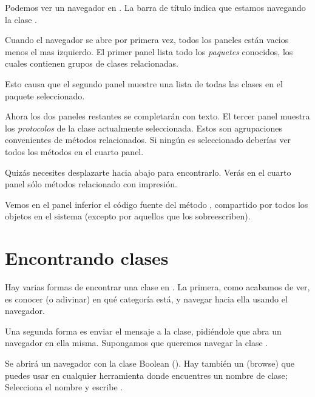 \documentclass[a4paper,10pt,twoside]{book}
\begin{document}
Podemos ver un navegador en .
La barra de t\'itulo indica que estamos navegando la clase .

Cuando el navegador se abre por primera vez, todos los paneles est\'an vacios menos el mas izquierdo.
El primer panel lista todo los \emph{paquetes} conocidos, los cuales contienen grupos de clases relacionadas.

Esto causa que el segundo panel muestre una lista de todas las clases en el paquete seleccionado.

Ahora los dos paneles restantes se completar\'an con texto.
El tercer panel muestra los \emph{protocolos} de la clase actualmente seleccionada.
Estos son agrupaciones convenientes de m\'etodos relacionados.
Si ning\'un  es seleccionado deber\'ias ver todos los m\'etodos en el cuarto panel.

Quiz\'as necesites desplazarte hacia abajo para encontrarlo.
Ver\'as en el cuarto panel s\'olo m\'etodos relacionado con impresi\'on.

Vemos en el panel inferior el c\'odigo fuente del m\'etodo , compartido por todos los objetos en el sistema (excepto por aquellos que los sobreescriben).

\section{Encontrando clases}

Hay varias formas de encontrar una clase en \pharo. La primera, como acabamos de ver, es conocer (o adivinar) en qu\'e categor\'ia est\'a, y navegar hacia ella usando el navegador.

Una segunda forma es enviar el mensaje  a la clase, pidi\'endole que abra un navegador en ella misma. Supongamos que queremos navegar la clase .

Se abrir\'a un navegador con la clase Boolean ().
Hay tambi\'en un   (browse) que puedes usar en cualquier herramienta donde encuentres un nombre de clase;
Selecciona el nombre y escribe .
\end{document}
